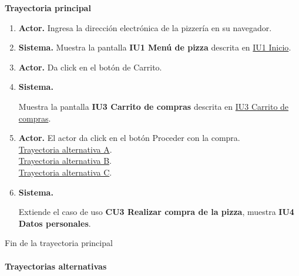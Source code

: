 \noindent \textbf{Trayectoria principal}

\begin{enumerate}
	\item {\textbf{Actor.}} Ingresa la dirección electrónica de la pizzería en su navegador.
	
	\item \textbf{Sistema.} Muestra la pantalla \textbf{IU1 Menú de pizza} descrita en \hyperlink{IU1}{IU1 Inicio}.
	
	\item {\textbf{Actor.}} Da click en el botón de Carrito.
	
	\item \hypertarget{CU2:TP:P4}{\textbf{Sistema.}} Muestra la pantalla \textbf{IU3 Carrito de compras} descrita en \hyperlink{IU3}{IU3 Carrito de compras}.
	
	\item \textbf{Actor.} El actor da click en el botón  Proceder con la compra.
	\\ \hyperlink{CU2:TAA}{Trayectoria alternativa A}.
	\\ \hyperlink{CU2:TAB}{Trayectoria alternativa B}. 
	\\ \hyperlink{CU2:TAC}{Trayectoria alternativa C}. 
	
	\item \hypertarget{CU1:TP:P4}{\textbf{Sistema.}} Extiende el caso de uso \textbf{CU3 Realizar compra de la pizza}, muestra \textbf{IU4 Datos personales}.
	

\end{enumerate}	
Fin de la trayectoria principal
\\
\noindent \textbf{\\Trayectorias alternativas}

